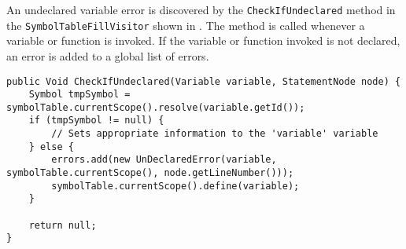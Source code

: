 An undeclared variable error is discovered by the \texttt{CheckIfUndeclared} method in the \texttt{SymbolTableFillVisitor} shown in .
The method is called whenever a variable or function is invoked.
If the variable or function invoked is not declared, an error is added to a global list of errors. 
\begin{lstlisting}[caption=The CheckIfUndeclared method in the SymbolTableFillVisitor class in the \gls{gamble} compiler,numbers=none,frame=tlrb,label={lst:CheckIfUndeclared}]
public Void CheckIfUndeclared(Variable variable, StatementNode node) {
    Symbol tmpSymbol = symbolTable.currentScope().resolve(variable.getId());
    if (tmpSymbol != null) {
        // Sets appropriate information to the 'variable' variable
    } else {
        errors.add(new UnDeclaredError(variable, symbolTable.currentScope(), node.getLineNumber()));
        symbolTable.currentScope().define(variable);
    }

    return null;
}
\end{lstlisting}

